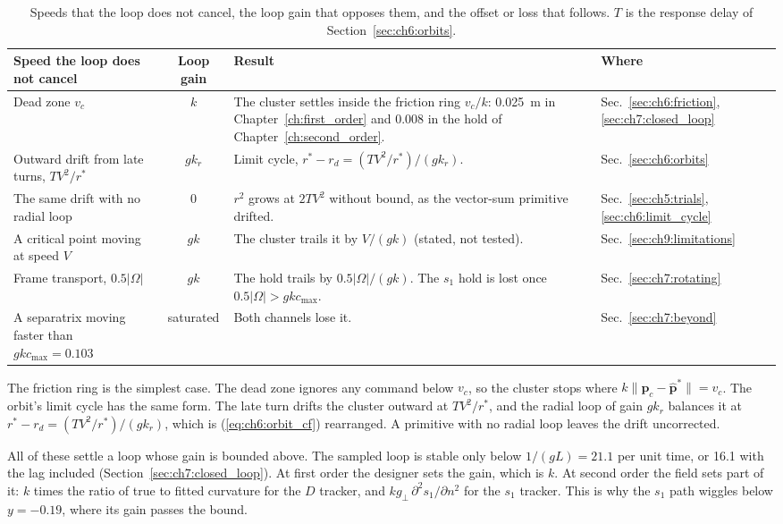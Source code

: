 \begin{table}[htbp]
\centering
\caption{Speeds that the loop does not cancel, the loop gain that opposes
them, and the offset or loss that follows. $T$ is the response delay of
Section~\ref{sec:ch6:orbits}.}
\label{tab:ch8:offsets}
\footnotesize
\begin{tabular}{>{\raggedright\arraybackslash}p{3.4cm} c >{\raggedright\arraybackslash}p{5.4cm} >{\raggedright\arraybackslash}p{2.4cm}}
\hline
Speed the loop does not cancel & Loop gain & Result & Where \\
\hline
Dead zone $v_c$ & $k$ & The cluster settles inside the friction ring $v_c/k$: 0.025~m in Chapter~\ref{ch:first_order} and 0.008 in the hold of Chapter~\ref{ch:second_order}. & Sec.~\ref{sec:ch6:friction}, \ref{sec:ch7:closed_loop} \\
Outward drift from late turns, $TV^2/r^*$ & $gk_r$ & Limit cycle, $r^* - r_d = (TV^2/r^*)/(gk_r)$. & Sec.~\ref{sec:ch6:orbits} \\
The same drift with no radial loop & $0$ & $r^2$ grows at $2TV^2$ without bound, as the vector-sum primitive drifted. & Sec.~\ref{sec:ch5:trials}, \ref{sec:ch6:limit_cycle} \\
A critical point moving at speed $V$ & $gk$ & The cluster trails it by $V/(gk)$ (stated, not tested). & Sec.~\ref{sec:ch9:limitations} \\
Frame transport, $0.5\lvert\Omega\rvert$ & $gk$ & The hold trails by $0.5\lvert\Omega\rvert/(gk)$. The $s_1$ hold is lost once $0.5\lvert\Omega\rvert > gkc_{\max}$. & Sec.~\ref{sec:ch7:rotating} \\
A separatrix moving faster than $gkc_{\max} = 0.103$ & saturated & Both channels lose it. & Sec.~\ref{sec:ch7:beyond} \\
\hline
\end{tabular}
\end{table}

The friction ring is the simplest case. The dead zone ignores any command
below $v_c$, so the cluster stops where $k\lVert\mathbf{p}_c -
\hat{\mathbf{p}}^*\rVert = v_c$. The orbit's limit cycle has the same
form. The late turn drifts the cluster outward at $TV^2/r^*$, and the
radial loop of gain $gk_r$ balances it at
$r^* - r_d = (TV^2/r^*)/(gk_r)$, which is (\ref{eq:ch6:orbit_cf})
rearranged. A primitive with no radial loop leaves the drift uncorrected.

All of these settle a loop whose gain is bounded above. The sampled loop
is stable only below $1/(gL) = 21.1$ per unit time, or 16.1 with the lag
included (Section~\ref{sec:ch7:closed_loop}). At first order the designer
sets the gain, which is $k$. At second order the field sets part of it: $k$
times the ratio of true to fitted curvature for the $D$ tracker, and
$k g_\perp\,\partial^2 s_1/\partial n^2$ for the $s_1$ tracker. This is why
the $s_1$ path wiggles below $y = -0.19$, where its gain passes the bound.

